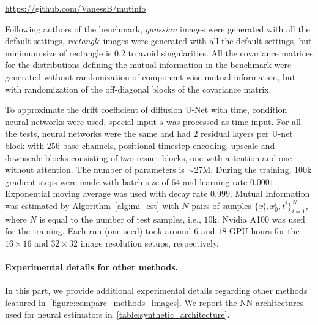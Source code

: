 \begin{center}
    \url{https://github.com/VanessB/mutinfo}
\end{center}

Following authors of the benchmark, \textit{gaussian} images were generated with all the default settings, \textit{rectangle} images were generated with all the default settings, but minimum size of rectangle is $0.2$ to avoid singularities.
All the covariance matrices for the distributions defining the mutual information in the benchmark were generated without randomization of component-wise mutual information, but with randomization of the off-diagonal blocks of the covariance matrix. 

To approximate the drift coefficient of diffusion U-Net \cite{ronneberger2015u} with time, condition neural networks were used, special input $s$ was processed as time input. For all the tests, neural networks were the same and had $2$ residual layers per U-net block with $256$ base channels, positional timestep encoding, upscale and downscale blocks consisting of two resnet blocks, one with attention and one without attention. The number of parameters is $\sim$27M. During the training, 100k gradient steps were made with batch size of 64 and learning rate $0.0001$. Exponential moving average was used with decay rate $0.999$. Mutual Information was estimated by Algorithm~\ref{alg:mi_est} with $N$ pairs of samples $\{x_t^i, x_0^i, t^i\}_{i=1}^N$, where $N$ is equal to the number of test samples, i.e., $10$k. Nvidia A100 was used for the \ourestname{} training. Each run (one seed) took around $6$ and $18$ GPU-hours for the $16\times16$ and  $32\times32$ image resolution setups, respectively.

\paragraph{Experimental details for other methods.}

In this part, we provide additional experimental details regarding other methods featured in~\cref{figure:compare_methods_images}.
We report the NN architectures used for neural estimators in~\cref{table:synthetic_architecture}.

